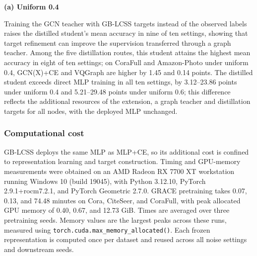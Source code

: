 \documentclass[10pt,letterpaper,nopreprintline]{elsarticle}
\theoremstyle{plain}
\begin{document}
\begin{table}[!htb]
\centering
\caption{Direct MLP training and graph-to-MLP distillation under uniform noise.}\label{tab:7}
{\small\textbf{(a) Uniform 0.4}}\par\smallskip



\par{}\par\smallskip



\end{table}

Training the GCN teacher with GB-LCSS targets instead of the observed labels raises the distilled student's mean accuracy in nine of ten settings, showing that target refinement can improve the supervision transferred through a graph teacher. Among the five distillation routes, this student attains the highest mean accuracy in eight of ten settings; on CoraFull and Amazon-Photo under uniform 0.4, GCN(X)+CE and VQGraph are higher by 1.45 and 0.14 points. The distilled student exceeds direct MLP training in all ten settings, by 3.12--23.86 points under uniform 0.4 and 5.21--29.48 points under uniform 0.6; this difference reflects the additional resources of the extension, a graph teacher and distillation targets for all nodes, with the deployed MLP unchanged.

\FloatBarrier

\subsubsection{Computational cost}\label{sec:4.4.2}

GB-LCSS deploys the same MLP as MLP+CE, so its additional cost is confined to representation learning and target construction. Timing and GPU-memory measurements were obtained on an AMD Radeon RX 7700 XT workstation running Windows 10 (build 19045), with Python 3.12.10, PyTorch 2.9.1+rocm7.2.1, and PyTorch Geometric 2.7.0. GRACE pretraining takes 0.07, 0.13, and 74.48 minutes on Cora, CiteSeer, and CoraFull, with peak allocated GPU memory of 0.40, 0.67, and 12.73 GiB. Times are averaged over three pretraining seeds. Memory values are the largest peaks across these runs, measured using \texttt{torch.cuda.max\_memory\_allocated()}. Each frozen representation is computed once per dataset and reused across all noise settings and downstream seeds.
\end{document}
